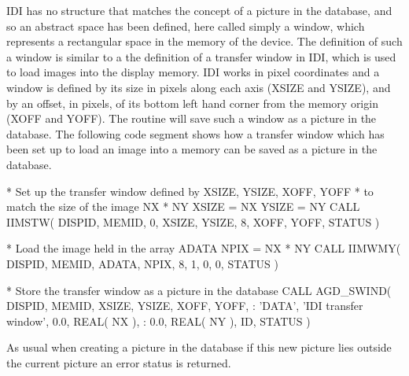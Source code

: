 \documentclass[twoside,11pt,nolof]{starlink}
\begin{document}
IDI has no structure that matches the concept of a picture in the database,
and so an abstract space has been defined, here called simply a window, which
represents a rectangular space in the memory of the device. The definition
of such a window is similar to a the definition of a transfer window in IDI,
which is used to load images into the display memory.
IDI works in pixel coordinates and a window is defined by its size in
pixels along each axis (XSIZE and YSIZE), and by an offset, in pixels,
of its bottom left hand corner from the memory origin (XOFF and YOFF).
The routine 
will save such a window as a picture in the
database. The following code segment shows how a transfer window which has
been set up to load an image into a memory can be saved as a picture in the
database.
\begin{terminalv}
    *   Set up the transfer window defined by XSIZE, YSIZE, XOFF, YOFF
    *   to match the size of the image NX * NY
          XSIZE = NX
          YSIZE = NY
          CALL IIMSTW( DISPID, MEMID, 0, XSIZE, YSIZE, 8, XOFF, YOFF, STATUS )

    *   Load the image held in the array ADATA
          NPIX = NX * NY
          CALL IIMWMY( DISPID, MEMID, ADATA, NPIX, 8, 1, 0, 0, STATUS )

    *   Store the transfer window as a picture in the database
          CALL AGD_SWIND( DISPID, MEMID, XSIZE, YSIZE, XOFF, YOFF,
         :                'DATA', 'IDI transfer window', 0.0, REAL( NX ),
         :                 0.0, REAL( NY ), ID, STATUS )
\end{terminalv}
As usual when creating a picture in the database if this new picture lies
outside the current picture an error status is returned.
\end{document}
